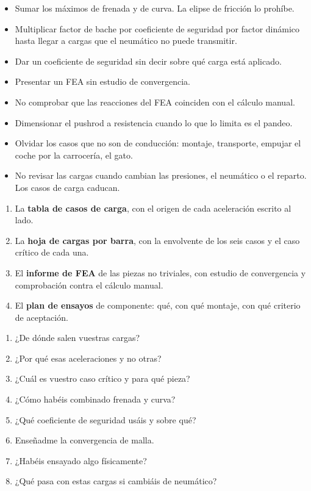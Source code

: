 \begin{ojo}
\begin{itemize}
  \item Sumar los máximos de frenada y de curva. La elipse de fricción lo
        prohíbe.
  \item Multiplicar factor de bache por coeficiente de seguridad por factor
        dinámico hasta llegar a cargas que el neumático no puede transmitir.
  \item Dar un coeficiente de seguridad sin decir sobre qué carga está aplicado.
  \item Presentar un FEA sin estudio de convergencia.
  \item No comprobar que las reacciones del FEA coinciden con el cálculo manual.
  \item Dimensionar el pushrod a resistencia cuando lo que lo limita es el
        pandeo.
  \item Olvidar los casos que no son de conducción: montaje, transporte, empujar
        el coche por la carrocería, el gato.
  \item No revisar las cargas cuando cambian las presiones, el neumático o el
        reparto. Los casos de carga caducan.
\end{itemize}
\end{ojo}

\begin{entregable}
\begin{enumerate}
  \item La \textbf{tabla de casos de carga}, con el origen de cada aceleración
        escrito al lado.
  \item La \textbf{hoja de cargas por barra}, con la envolvente de los seis
        casos y el caso crítico de cada una.
  \item El \textbf{informe de FEA} de las piezas no triviales, con estudio de
        convergencia y comprobación contra el cálculo manual.
  \item El \textbf{plan de ensayos} de componente: qué, con qué montaje, con qué
        criterio de aceptación.
\end{enumerate}
\end{entregable}

\begin{juez}
\begin{enumerate}
  \item ¿De dónde salen vuestras cargas?
  \item ¿Por qué esas aceleraciones y no otras?
  \item ¿Cuál es vuestro caso crítico y para qué pieza?
  \item ¿Cómo habéis combinado frenada y curva?
  \item ¿Qué coeficiente de seguridad usáis y sobre qué?
  \item Enseñadme la convergencia de malla.
  \item ¿Habéis ensayado algo físicamente?
  \item ¿Qué pasa con estas cargas si cambiáis de neumático?
\end{enumerate}
\end{juez}
